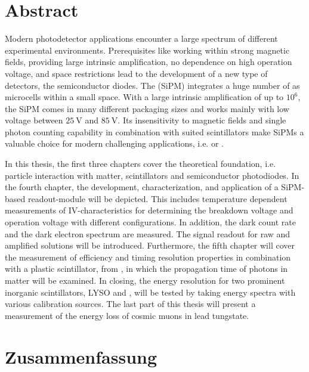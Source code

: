 \chapter*{Abstract}
%

Modern photodetector applications encounter a large spectrum of different experimental environments. Prerequisites like working within strong magnetic fields, providing large intrinsic amplification, no dependence on high operation voltage, and space restrictions lead to the development of a new type of detectors, the semiconductor diodes. The  (SiPM) integrates a huge number of  as microcells within a small space. With a large intrinsic amplification of up to $10^6$, the SiPM comes in many different packaging sizes and works mainly with low voltage between $\SI{25}{\volt}$ and $\SI{85}{\volt}$. Its insensitivity to magnetic fields and single photon counting capability in combination with suited scintillators make SiPMs a valuable choice for modern challenging applications, i.e.  or . \par 
In this thesis, the first three chapters cover the theoretical foundation, i.e. particle interaction with matter, scintillators and semiconductor photodiodes. In the fourth chapter, the development, characterization, and application of a SiPM-based readout-module will be depicted. This includes temperature dependent measurements of IV-characteristics for determining the breakdown voltage and operation voltage with different configurations. In addition, the dark count rate and the dark electron spectrum are measured. The signal readout for raw and amplified solutions will be introduced. Furthermore, the fifth chapter will cover the measurement of efficiency and timing resolution properties in combination with a plastic scintillator,  from , in which the propagation time of photons in matter will be examined. In closing, the energy resolution for two prominent inorganic scintillators, LYSO and \pwo{}, will be tested by taking energy spectra with various calibration sources. The last part of this thesis will present a measurement of the energy loss of cosmic muons in lead tungstate.  

\chapter*{Zusammenfassung}
%

